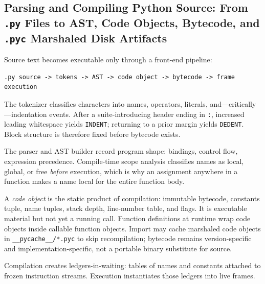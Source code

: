 \subsection{Parsing and Compiling Python Source: From \texttt{.py} Files to AST, Code Objects, Bytecode, and \texttt{.pyc} Marshaled Disk Artifacts}

Source text becomes executable only through a front-end pipeline:

\begin{verbatim}
.py source -> tokens -> AST -> code object -> bytecode -> frame execution
\end{verbatim}

The tokenizer classifies characters into names, operators, literals, and---critically---indentation events. After a suite-introducing header ending in \texttt{:}, increased leading whitespace yields \texttt{INDENT}; returning to a prior margin yields \texttt{DEDENT}. Block structure is therefore fixed before bytecode exists.

The parser and AST builder record program shape: bindings, control flow, expression precedence. Compile-time scope analysis classifies names as local, global, or free \emph{before} execution, which is why an assignment anywhere in a function makes a name local for the entire function body.

A \emph{code object} is the static product of compilation: immutable bytecode, constants tuple, name tuples, stack depth, line-number table, and flags. It is executable material but not yet a running call. Function definitions at runtime wrap code objects inside callable function objects. Import may cache marshaled code objects in \texttt{\_\_pycache\_\_/*.pyc} to skip recompilation; bytecode remains version-specific and implementation-specific, not a portable binary substitute for source.

Compilation creates ledgers-in-waiting: tables of names and constants attached to frozen instruction streams. Execution instantiates those ledgers into live frames.
